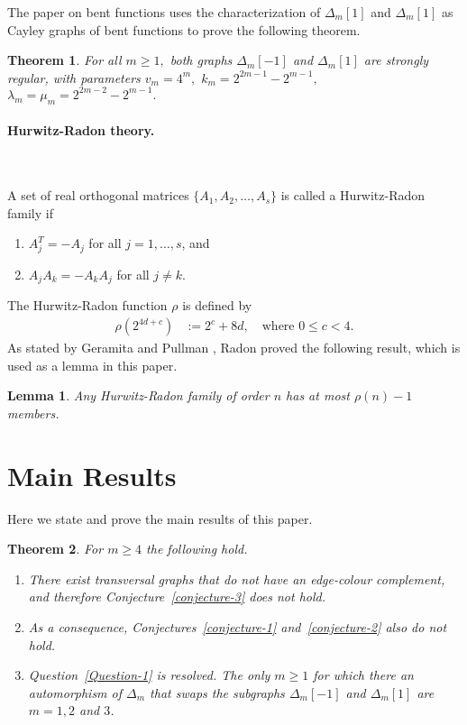 \documentclass[12pt,a4paper]{article}
\newtheorem{Lemma}{Lemma}
\newtheorem{Theorem}{Theorem}
\begin{document}
The paper on bent functions \cite{Leo15Bent} uses the characterization of $\varDelta_m[1]$ and $\varDelta_m[1]$ 
as Cayley graphs of bent functions to prove the following theorem. 
\begin{Theorem}\label{Twins-are-strongly-regular-theorem}
%
For all $m \geqslant 1,$
both graphs $\varDelta_m[-1]$ and $\varDelta_m[1]$ are strongly regular, with parameters
$v_m = 4^m,$ $k_m = 2^{2 m - 1} - 2^{m - 1},$ $\lambda_m=\mu_m=2^{2 m - 2} - 2^{m - 1}.$
%
\end{Theorem}

\paragraph*{Hurwitz-Radon theory.}
\label{sec-Hurwitz-Radon}

~

A set of real orthogonal matrices $\{A_1,A_2,\ldots,A_s\}$ is called a Hurwitz-Radon family 
\cite{GerP74a,Hur22,Rad22} if
\begin{enumerate}
 \item
$A_j^T = -A_j$ for all $j=1,\ldots,s$, and
 \item 
$A_j A_k = -A_k A_j$ for all $j \neq k$.
\end{enumerate}
The Hurwitz-Radon function $\rho$ is defined by
\begin{align*}
\rho(2^{4 d + c}) &:= 2^c + 8 d, \quad \text{where~} 0 \leqslant c < 4.
\end{align*}
As stated by Geramita and Pullman \cite[Theorem A]{GerP74a}, Radon \cite{Rad22}
proved the following result, which is used as a lemma in this paper.
\begin{Lemma}\label{Hurwitz-Radon-lemma}
Any Hurwitz-Radon family of order $n$ has at most $\rho(n)-1$ members.
\end{Lemma}
\newpage
\section{Main Results}
\label{sec-Results}
Here we state and prove the main results of this paper.
\begin{Theorem}
\label{Conjectures-are-false-theorem}
For $m \geqslant 4$ the following hold.
\begin{enumerate}
 \item 
There exist transversal graphs that do not have an edge-colour complement, and
therefore Conjecture~\ref{conjecture-3} does not hold.
\item
As a consequence, Conjectures~\ref{conjecture-1} and~\ref{conjecture-2} also do not hold.
\item
Question~\ref{Question-1} is resolved.
The only $m \geqslant 1$ for which there an automorphism of $\varDelta_m$ 
that swaps the subgraphs $\varDelta_m[-1]$ and $\varDelta_m[1]$
are $m=1,2$ and $3$.
\end{enumerate}

\end{Theorem}
\end{document}

